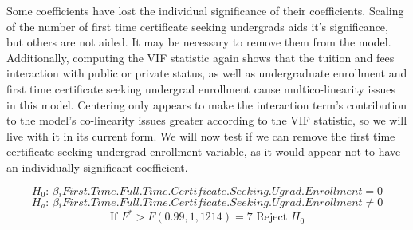 \documentclass{article}
\begin{document}
\begin{table}[ht]
\caption{F = 357.8953 (n = 1351 on 1214 degrees of freedom)} 
\end{table}
\FloatBarrier

Some coefficients have lost the individual significance of their coefficients. Scaling of the number of first time certificate seeking undergrads aids it's significance, but others are not aided. It may be necessary to remove them from the model. Additionally, computing the VIF statistic again shows that the tuition and fees interaction with public or private status, as well as undergraduate enrollment and first time certificate seeking undergrad enrollment cause multico-linearity issues in this model. Centering only appears to make the interaction term's contribution to the model's co-linearity issues greater according to the VIF statistic, so we will live with it in its current form. We will now test if we can remove the first time certificate seeking undergrad enrollment variable, as it would appear not to have an individually significant coefficient.

$$ H_0 \text{: } \beta{}_iFirst.Time.Full.Time.Certificate.Seeking.Ugrad.Enrollment = 0 $$
$$ H_a \text{: } \beta{}_iFirst.Time.Full.Time.Certificate.Seeking.Ugrad.Enrollment  $$
$$  F^* > F(0.99,1,1214) = 7 H_0 $$
\end{document}
